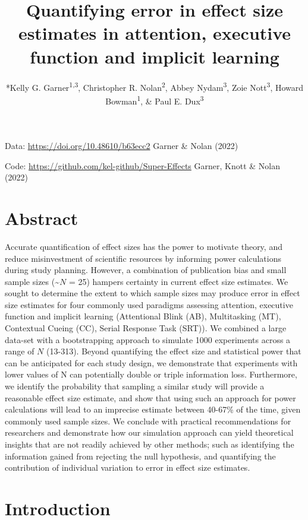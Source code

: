 \documentclass[
  man]{apa6}
\title{Quantifying error in effect size estimates in attention, executive function and implicit learning}
\author{*Kelly G. Garner\textsuperscript{1,3}, Christopher R. Nolan\textsuperscript{2}, Abbey Nydam\textsuperscript{3}, Zoie Nott\textsuperscript{3}, Howard Bowman\textsuperscript{1}, \& Paul E. Dux\textsuperscript{3}}
\date{}
\affiliation{\vspace{0.5cm}\textsuperscript{1} School of Psychology, University of Birmingham, UK\\\textsuperscript{2} School of Psychology, University of New South Wales, Australia\\\textsuperscript{3} School of Psychology, The University of Queensland, Australia}
\begin{document}
\maketitle

Data: \url{https://doi.org/10.48610/b63ecc2} Garner \& Nolan (2022)

Code: \url{https://github.com/kel-github/Super-Effects} Garner, Knott \& Nolan (2022)

\clearpage

\hypertarget{abstract}{%
\section{Abstract}\label{abstract}}

Accurate quantification of effect sizes has the power to motivate theory, and reduce misinvestment of scientific resources by informing power calculations during study planning. However, a combination of publication bias and small sample sizes (\textasciitilde{}\(N\) = 25) hampers certainty in current effect size estimates. We sought to determine the extent to which sample sizes may produce error in effect size estimates for four commonly used paradigms assessing attention, executive function and implicit learning (Attentional Blink (AB), Multitasking (MT), Contextual Cueing (CC), Serial Response Task (SRT)). We combined a large data-set with a bootstrapping approach to simulate 1000 experiments across a range of \(N\) (13-313). Beyond quantifying the effect size and statistical power that can be anticipated for each study design, we demonstrate that experiments with lower values of N can potentially double or triple information loss. Furthermore, we identify the probability that sampling a similar study will provide a reasonable effect size estimate, and show that using such an approach for power calculations will lead to an imprecise estimate between 40-67\% of the time, given commonly used sample sizes. We conclude with practical recommendations for researchers and demonstrate how our simulation approach can yield theoretical insights that are not readily achieved by other methods; such as identifying the information gained from rejecting the null hypothesis, and quantifying the contribution of individual variation to error in effect size estimates.

\clearpage

\hypertarget{introduction}{%
\section{Introduction}\label{introduction}}
\end{document}
